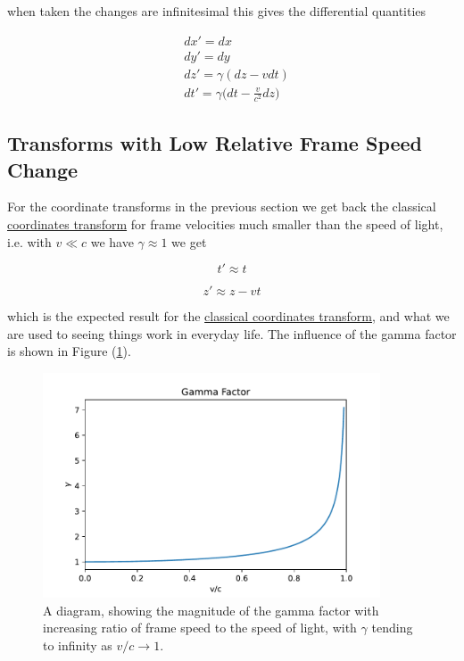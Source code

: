 when taken the changes are infinitesimal this gives the differential quantities

\begin{equation}
	\label{eq: Infintesmal interval of Coordinates}
	\begin{aligned}
		 & dx{'}=dx                                        \\
		 & dy{'}=dy                                        \\
		 & dz{'} = {\gamma} (dz-vdt)                       \\
		 & dt{'}={\gamma} \bigg(dt-\frac{v}{c^2} dz \bigg)
	\end{aligned}
\end{equation}

\subsection{Transforms with Low Relative Frame Speed Change}

For the coordinate transforms in the previous section we get back the classical \hyperlink{def-galilean-transform}{coordinates transform} for frame velocities much smaller than the speed of light, i.e.
with $v\ll c$ we have ${\gamma} \approx 1$ we get

\begin{equation}
	t{'} \approx t
\end{equation}

\begin{equation}
	z{'} \approx z - vt
\end{equation}

which is the expected result for the \hyperlink{def-galilean-transform}{classical coordinates transform}, and what we are used to seeing things work in everyday life.
The influence of the gamma factor is shown in Figure (\ref{fig: Gamma Factor}).

\begin{figure}[H]
	\centering
	\includegraphics[width=10cm]{images/pdf/Gamma_Factor.pdf}
	\caption{A diagram, showing the magnitude of the gamma factor with increasing ratio of frame speed to the speed of light, with ${\gamma}$ tending to infinity as $v/c\rightarrow 1$.}
	\label{fig: Gamma Factor}
\end{figure}

